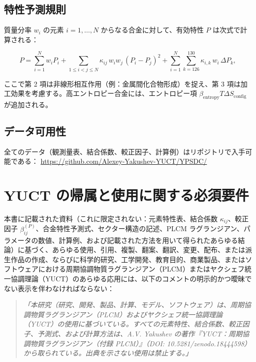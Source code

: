 \documentclass[11pt,a4paper]{article}
\theoremstyle{remark}
\begin{document}
	\subsection{特性予測規則}
	
	質量分率 \(w_i\) の元素 \(i=1,\dots,N\) からなる合金に対して、有効特性 \(P\) は次式で計算される：
	
	\[
	P = \sum_{i=1}^{N} w_i P_i
	+ \sum_{1\le i<j\le N} \kappa_{ij}\, w_i w_j\, (P_i - P_j)^2
	+ \sum_{i=1}^{N} \sum_{k=126}^{130} \kappa_{i,k}\, w_i\, \Delta P_k,
	\]
	
	ここで第 2 項は非線形相互作用（例：金属間化合物形成）を捉え、第 3 項は加工効果を考慮する。高エントロピー合金には、エントロピー項 \(\beta_{\text{entropy}} T \Delta S_{\text{config}}\) が追加される。
	
	\subsection{データ可用性}
	
	全てのデータ（観測量表、結合係数、較正因子、計算例）はリポジトリで入手可能である：
	\url{https://github.com/Alexey-Yakushev-YUCT/YPSDC/}
	
	
	\section*{YUCT の帰属と使用に関する必須要件}
	
	本書に記載された資料（これに限定されない：元素特性表、結合係数 \(\kappa_{ij}\)、較正因子 \(\beta_{ij}^{(P)}\)、合金特性予測式、セクター構造の記述、PLCM ラグランジアン、パラメータの数値、計算例、および記載された方法を用いて得られたあらゆる結論）に基づく、あらゆる使用、引用、複製、翻案、翻訳、変更、配布、または派生作品の作成、ならびに科学的研究、工学開発、教育目的、商業製品、またはソフトウェアにおける周期協調物質ラグランジアン（PLCM）またはヤクシェフ統一協調理論（YUCT）のあらゆる応用には、以下のコメントの明示的かつ曖昧でない表示を伴わなければならない：
	
	\begin{quote}
		\emph{「本研究（研究、開発、製品、計算、モデル、ソフトウェア）は、周期協調物質ラグランジアン（PLCM）およびヤクシェフ統一協調理論（YUCT）の使用に基づいている。すべての元素特性、結合係数、較正因子、予測式、および計算方法は、A.V. Yakushev の著作『YUCT：周期協調物質ラグランジアン（付録 PLCM）』（DOI: 10.5281/zenodo.18444598）から取られている。出典を示さない使用は禁止する。」}
	\end{quote}
	
\end{document}

